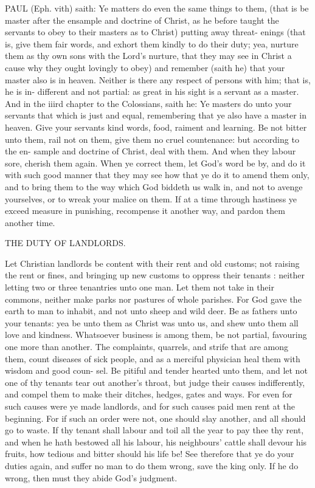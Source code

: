 \documentclass{custom}
\begin{document}
PAUL (Eph. vith) saith: Ye matters do even the same 
things to them, (that is be master after the ensample 
and doctrine of Christ, as he before taught the servants to 
obey to their masters as to Christ) putting away threat- 
enings (that is, give them fair words, and exhort them 
kindly to do their duty; yea, nurture them as thy own 
sons with the Lord's nurture, that they may see in Christ 
a cause why they ought lovingly to obey) and remember 
(saith he) that your master also is in heaven. Neither is 
there any respect of persons with him; that is, he is in- 
different and not partial: as great in his sight is a servant 
as a master. And in the iiird chapter to the Colossians, 
saith he: Ye masters do unto your servants that which is 
just and equal, remembering that ye also have a master in 
heaven. Give your servants kind words, food, raiment 
and learning. Be not bitter unto them, rail not on them, 
give them no cruel countenance: but according to the en- 
sample and doctrine of Christ, deal with them. And 
when they labour sore, cherish them again. When ye 
correct them, let God's word be by, and do it with such 
good manner that they may see how that ye do it to amend 
them only, and to bring them to the way which God 
biddeth us walk in, and not to avenge yourselves, or to 
wreak your malice on them. If at a time through hastiness 
ye exceed measure in punishing, recompense it another 
way, and pardon them another time. 


THE DUTY OF LANDLORDS. 

Let Christian landlords be content with their rent and 
old customs; not raising the rent or fines, and bringing 
up new customs to oppress their tenants : neither letting 
two or three tenantries unto one man. Let them not take 
in their commons, neither make parks nor pastures of 
whole parishes. For God gave the earth to man to inhabit, 
and not unto sheep and wild deer. Be as fathers unto 
your tenants: yea be unto them as Christ was unto us, 
and shew unto them all love and kindness. Whatsoever 
business is among them, be not partial, favouring one more 
than another. The complaints, quarrels, and strife that 
are among them, count diseases of sick people, and as a 
merciful physician heal them with wisdom and good coun- 
sel. Be pitiful and tender hearted unto them, and let not 
one of thy tenants tear out another's throat, but judge 
their causes indifferently, and compel them to make their 
ditches, hedges, gates and ways. For even for such causes 
were ye made landlords, and for such causes paid men rent 
at the beginning. For if such an order were not, one 
should slay another, and all should go to waste. If thy 
tenant shall labour and toil all the year to pay thee thy rent, 
and when he hath bestowed all his labour, his neighbours' 
cattle shall devour his fruits, how tedious and bitter should 
his life be! See therefore that ye do your duties again, and 
suffer no man to do them wrong, save the king only. If 
he do wrong, then must they abide God's judgment. 
\end{document}
